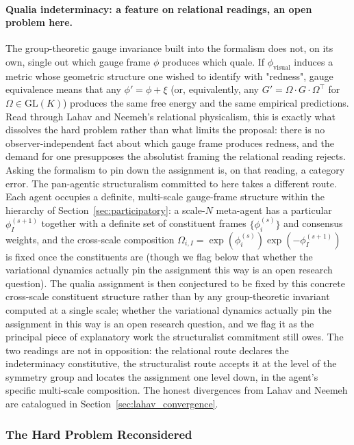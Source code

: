 \documentclass[11pt]{article}
\begin{document}
\paragraph{Qualia indeterminacy: a feature on relational readings, an open problem here.}
The group-theoretic gauge invariance built into the formalism does not, on its own, single out which gauge frame $\phi$ produces which quale. If $\phi_{\text{visual}}$ induces a metric whose geometric structure one wished to identify with "redness", gauge equivalence means that any $\phi' = \phi + \xi$ (or, equivalently, any $G' = \Omega \cdot G \cdot \Omega^\top$ for $\Omega \in \mathrm{GL}(K)$) produces the same free energy and the same empirical predictions. Read through Lahav and Neemeh's relational physicalism, this is exactly what dissolves the hard problem rather than what limits the proposal: there is no observer-independent fact about which gauge frame produces redness, and the demand for one presupposes the absolutist framing the relational reading rejects. Asking the formalism to pin down the assignment is, on that reading, a category error. The pan-agentic structuralism committed to here takes a different route. Each agent occupies a definite, multi-scale gauge-frame structure within the hierarchy of Section~\ref{sec:participatory}: a scale-$N$ meta-agent has a particular $\phi_I^{(s+1)}$ together with a definite set of constituent frames $\{\phi_i^{(s)}\}$ and consensus weights, and the cross-scale composition $\Omega_{i,I} = \exp(\phi_i^{(s)}) \exp(-\phi_I^{(s+1)})$ is fixed once the constituents are (though we flag below that whether the variational dynamics actually pin the assignment this way is an open research question). The qualia assignment is then conjectured to be fixed by this concrete cross-scale constituent structure rather than by any group-theoretic invariant computed at a single scale; whether the variational dynamics actually pin the assignment in this way is an open research question, and we flag it as the principal piece of explanatory work the structuralist commitment still owes. The two readings are not in opposition: the relational route declares the indeterminacy constitutive, the structuralist route accepts it at the level of the symmetry group and locates the assignment one level down, in the agent's specific multi-scale composition. The honest divergences from Lahav and Neemeh are catalogued in Section~\ref{sec:lahav_convergence}.

\subsubsection{The Hard Problem Reconsidered}
\end{document}
